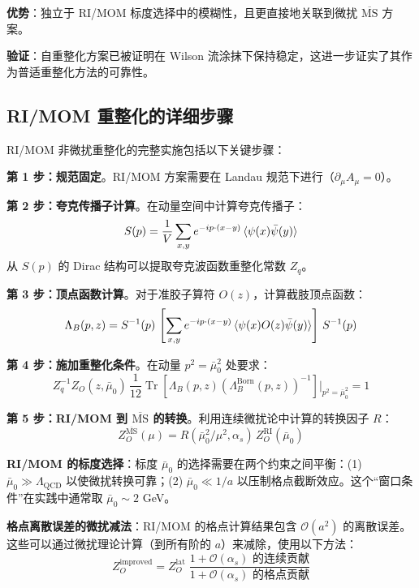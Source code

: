 \documentclass[11pt,a4paper]{ctexart}
\newcommand{\order}[1]{\mathcal{O}(#1)}
\begin{document}
\textbf{优势}：独立于 RI/MOM 标度选择中的模糊性，且更直接地关联到微扰 $\overline{\text{MS}}$ 方案。

\textbf{验证}：自重整化方案已被证明在 Wilson 流涂抹下保持稳定，这进一步证实了其作为普适重整化方法的可靠性。

\subsection{RI/MOM 重整化的详细步骤}

RI/MOM 非微扰重整化的完整实施包括以下关键步骤：

\textbf{第 1 步：规范固定}。RI/MOM 方案需要在 Landau 规范下进行（$\partial_\mu A_\mu = 0$）。

\textbf{第 2 步：夸克传播子计算}。在动量空间中计算夸克传播子：
\begin{equation}
S(p) = \frac{1}{V} \sum_{x,y} e^{-i p \cdot (x-y)} \braket{\psi(x) \bar{\psi}(y)}
\end{equation}
从 $S(p)$ 的 Dirac 结构可以提取夸克波函数重整化常数 $Z_q$。

\textbf{第 3 步：顶点函数计算}。对于准胶子算符 $O(z)$，计算截肢顶点函数：
\begin{equation}
\Lambda_B(p, z) = S^{-1}(p) \, \left[ \sum_{x,y} e^{-i p \cdot (x-y)} \braket{\psi(x) O(z) \bar{\psi}(y)} \right] \, S^{-1}(p)
\end{equation}

\textbf{第 4 步：施加重整化条件}。在动量 $p^2 = \bar{\mu}_0^2$ 处要求：
\begin{equation}
Z_q^{-1} Z_O(z, \bar{\mu}_0) \, \frac{1}{12} \operatorname{Tr}\!\left[
\Lambda_B(p, z) \left( \Lambda_B^{\text{Born}}(p, z) \right)^{-1} \right] \Big|_{p^2 = \bar{\mu}_0^2} = 1
\end{equation}

\textbf{第 5 步：RI/MOM 到 $\overline{\text{MS}}$ 的转换}。利用连续微扰论中计算的转换因子 $R$：
\begin{equation}
Z_O^{\overline{\text{MS}}}(\mu) = R(\bar{\mu}_0^2/\mu^2, \alpha_s) \, Z_O^{\text{RI}}(\bar{\mu}_0)
\end{equation}

\textbf{RI/MOM 的标度选择}：标度 $\bar{\mu}_0$ 的选择需要在两个约束之间平衡：(1) $\bar{\mu}_0 \gg \Lambda_{\text{QCD}}$ 以使微扰转换可靠；(2) $\bar{\mu}_0 \ll 1/a$ 以压制格点截断效应。这个``窗口条件''在实践中通常取 $\bar{\mu}_0 \sim 2$ GeV。

\textbf{格点离散误差的微扰减法}：RI/MOM 的格点计算结果包含 $\order{a^2}$ 的离散误差。这些可以通过微扰理论计算（到所有阶的 $a$）来减除，使用以下方法：
\begin{equation}
Z_O^{\text{improved}} = Z_O^{\text{lat}} \;
\frac{1 + \order{\alpha_s} \text{ 的连续贡献}}{1 + \order{\alpha_s} \text{ 的格点贡献}}
\end{equation}
\end{document}
